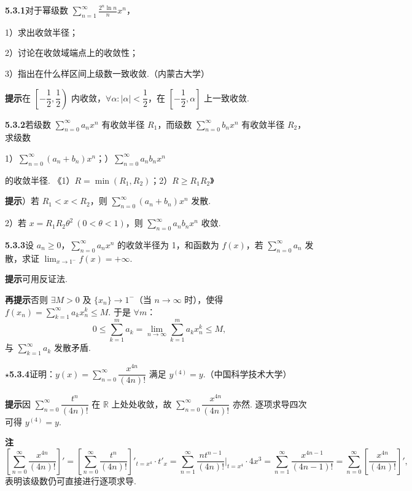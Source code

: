 \documentclass[UTF8,12pt,a4paper,fontset=fandol]{ctexart}
\begin{document}
\noindent\textbf{5.3.1}\quad 对于幂级数 $\displaystyle\sum_{n=1}^{\infty}\frac{2^n\ln n}{n}x^n$，

1）求出收敛半径；

2）讨论在收敛域端点上的收敛性；

3）指出在什么样区间上级数一致收敛.（内蒙古大学）

\noindent\textbf{提示}\quad 在 $\left[-\dfrac12,\dfrac12\right)$ 内收敛，$\forall\alpha:|\alpha|<\dfrac12$，在 $\left[-\dfrac12,\alpha\right]$ 上一致收敛.

\noindent\textbf{5.3.2}\quad 若级数 $\displaystyle\sum_{n=0}^{\infty}a_nx^n$ 有收敛半径 $R_1$，而级数 $\displaystyle\sum_{n=0}^{\infty}b_nx^n$ 有收敛半径 $R_2$，求级数

1）$\displaystyle\sum_{n=0}^{\infty}(a_n+b_n)x^n$；）$\displaystyle\sum_{n=0}^{\infty}a_nb_nx^n$

的收敛半径. \hfill 《1）$R=\min(R_1,R_2)$；2）$R\ge R_1R_2$》

\noindent\textbf{提示}）若 $R_1<x<R_2$，则 $\displaystyle\sum_{n=0}^{\infty}(a_n+b_n)x^n$ 发散.

2）若 $x=R_1R_2\theta^2\ (0<\theta<1)$，则 $\displaystyle\sum_{n=0}^{\infty}a_nb_nx^n$ 收敛.

\noindent\textbf{5.3.3}\quad 设 $a_n\ge0$，$\displaystyle\sum_{n=0}^{\infty}a_nx^n$ 的收敛半径为 1，和函数为 $f(x)$，若 $\displaystyle\sum_{n=0}^{\infty}a_n$ 发散，求证 $\displaystyle\lim_{x\to1^-}f(x)=+\infty$.

\noindent\textbf{提示}\quad 可用反证法.

\noindent\textbf{再提示}\quad 否则 $\exists M>0$ 及 $\{x_n\}\to1^-$（当 $n\to\infty$ 时），使得 $f(x_n)=\displaystyle\sum_{k=1}^{\infty}a_kx_n^k\le M$. 于是 $\forall m$：
\[
  0\le\sum_{k=1}^m a_k=\lim_{n\to\infty}\sum_{k=1}^m a_kx_n^k\le M,
\]
与 $\displaystyle\sum_{k=1}^{\infty}a_k$ 发散矛盾.

\noindent\textbf{\(\star\)5.3.4}\quad 证明：$y(x)=\displaystyle\sum_{n=0}^{\infty}\dfrac{x^{4n}}{(4n)!}$ 满足 $y^{(4)}=y$.（中国科学技术大学）

\noindent\textbf{提示}\quad 因 $\displaystyle\sum_{n=0}^{\infty}\dfrac{t^n}{(4n)!}$ 在 $\mathbb R$ 上处处收敛，故 $\displaystyle\sum_{n=0}^{\infty}\dfrac{x^{4n}}{(4n)!}$ 亦然. 逐项求导四次可得 $y^{(4)}=y$.

\noindent\textbf{注}\quad
\[
  \left[\sum_{n=0}^{\infty}\frac{x^{4n}}{(4n)!}\right]'
  =\left[\sum_{n=0}^{\infty}\frac{t^n}{(4n)!}\right]'_{t=x^4}\cdot t'_x
  =\sum_{n=1}^{\infty}\frac{nt^{n-1}}{(4n)!}\bigg|_{t=x^4}\cdot4x^3
  =\sum_{n=1}^{\infty}\frac{x^{4n-1}}{(4n-1)!}
  =\sum_{n=0}^{\infty}\left[\frac{x^{4n}}{(4n)!}\right]',
\]
表明该级数仍可直接进行逐项求导.
\end{document}
